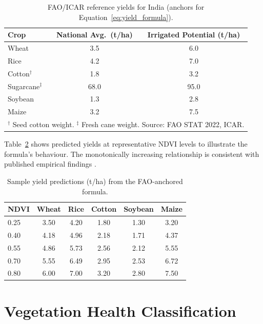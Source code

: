 \documentclass[12pt,a4paper,oneside]{report}
\begin{document}
\begin{table}[h]
\centering
\caption{FAO/ICAR reference yields for India (anchors for Equation~\ref{eq:yield_formula}).}
\label{tab:fao_yields}
\begin{tabular}{lcc}
\toprule
\textbf{Crop} & \textbf{National Avg.\ (t/ha)} & \textbf{Irrigated Potential (t/ha)} \\
\midrule
Wheat              & 3.5  & 6.0  \\
Rice               & 4.2  & 7.0  \\
Cotton$^\dagger$   & 1.8  & 3.2  \\
Sugarcane$^\ddagger$ & 68.0 & 95.0 \\
Soybean            & 1.3  & 2.8  \\
Maize              & 3.2  & 7.5  \\
\bottomrule
\multicolumn{3}{l}{\footnotesize $^\dagger$ Seed cotton weight.
\quad $^\ddagger$ Fresh cane weight. \quad Source: FAO STAT 2022, ICAR.}
\end{tabular}
\end{table}

Table~\ref{tab:yield_samples} shows predicted yields at representative NDVI levels
to illustrate the formula's behaviour. The monotonically increasing relationship is
consistent with published empirical findings \cite{jeong2016random, li2024crop}.

\begin{table}[h]
\centering
\caption{Sample yield predictions (t/ha) from the FAO-anchored formula.}
\label{tab:yield_samples}
\begin{tabular}{lccccc}
\toprule
\textbf{NDVI} & \textbf{Wheat} & \textbf{Rice} & \textbf{Cotton} & \textbf{Soybean} & \textbf{Maize} \\
\midrule
0.25 & 3.50 & 4.20 & 1.80 & 1.30 & 3.20 \\
0.40 & 4.18 & 4.96 & 2.18 & 1.71 & 4.37 \\
0.55 & 4.86 & 5.73 & 2.56 & 2.12 & 5.55 \\
0.70 & 5.55 & 6.49 & 2.95 & 2.53 & 6.72 \\
0.80 & 6.00 & 7.00 & 3.20 & 2.80 & 7.50 \\
\bottomrule
\end{tabular}
\end{table}

\section{Vegetation Health Classification}
\end{document}
